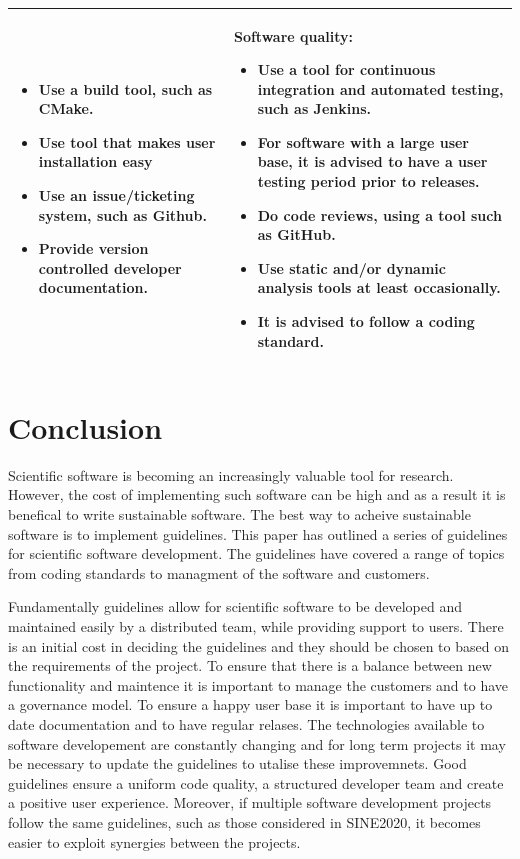 \documentclass[jnr]{iosart2x}
\begin{document}
\begin{tabular}{l|l}
\begin{minipage}[t]{0.4\textwidth}
\begin{itemize}
      \item Use a build tool, such as CMake.
      \item Use tool that makes user installation easy
      \item Use an issue/ticketing system, such as Github.
      \item Provide version controlled developer documentation.
    \end{itemize}
  \end{minipage} & 
  \begin{minipage}[t]{0.4\textwidth}
    Software quality:
    \begin{itemize}
      \item Use a tool for continuous integration and automated testing, such as Jenkins.
      \item For software with a large user base, it is advised to have a user testing period prior to releases.
      \item Do code reviews, using a tool such as GitHub.
      \item Use static and/or dynamic analysis tools at least occasionally.
      \item It is advised to follow a coding standard.
    \end{itemize}
  \end{minipage}  \\  
 \hline
\end{tabular}

\section{Conclusion}
\label{Conclusion}

Scientific software is becoming an increasingly valuable tool for research.
However, the cost of implementing such software can be high and as a result it is benefical to write sustainable software.
The best way to acheive sustainable software is to implement guidelines.
This paper has outlined a series of guidelines for scientific software development.
The guidelines have covered a range of topics from coding standards to managment of the software and customers.

Fundamentally guidelines allow for scientific software to be developed and maintained easily by a distributed team, while providing support to users.
There is an initial cost in deciding the guidelines and they should be chosen to based on the requirements of the project.
To ensure that there is a balance between new functionality and maintence it is important to manage the customers and to have a governance model.
To ensure a happy user base it is important to have up to date documentation and to have regular relases.
The technologies available to software developement are constantly changing and for long term projects it may be necessary to update the guidelines to utalise these improvemnets.
Good guidelines ensure a uniform code quality, a structured developer team and create a positive user experience. Moreover, if multiple software development projects follow the same guidelines, such as those considered in SINE2020, it becomes easier to exploit synergies between the projects.
\end{document}
